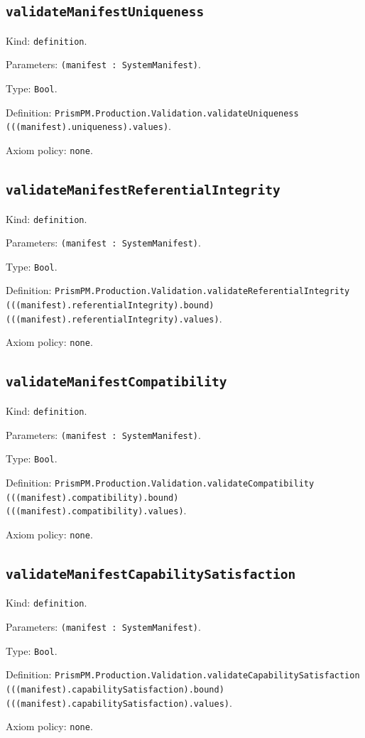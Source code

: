 \documentclass[11pt]{article}
\begin{document}
\subsection*{\texttt{validateManifestUniqueness}}
\noindent Kind: \texttt{definition}.\par
\noindent Parameters: \texttt{(manifest : SystemManifest)}.\par
\noindent Type: \texttt{Bool}.\par
\noindent Definition: \texttt{PrismPM.Production.Validation.validateUniqueness (((manifest).uniqueness).values)}.\par
\noindent Axiom policy: \texttt{none}.\par
\subsection*{\texttt{validateManifestReferentialIntegrity}}
\noindent Kind: \texttt{definition}.\par
\noindent Parameters: \texttt{(manifest : SystemManifest)}.\par
\noindent Type: \texttt{Bool}.\par
\noindent Definition: \texttt{PrismPM.Production.Validation.validateReferentialIntegrity (((manifest).referentialIntegrity).bound) (((manifest).referentialIntegrity).values)}.\par
\noindent Axiom policy: \texttt{none}.\par
\subsection*{\texttt{validateManifestCompatibility}}
\noindent Kind: \texttt{definition}.\par
\noindent Parameters: \texttt{(manifest : SystemManifest)}.\par
\noindent Type: \texttt{Bool}.\par
\noindent Definition: \texttt{PrismPM.Production.Validation.validateCompatibility (((manifest).compatibility).bound) (((manifest).compatibility).values)}.\par
\noindent Axiom policy: \texttt{none}.\par
\subsection*{\texttt{validateManifestCapabilitySatisfaction}}
\noindent Kind: \texttt{definition}.\par
\noindent Parameters: \texttt{(manifest : SystemManifest)}.\par
\noindent Type: \texttt{Bool}.\par
\noindent Definition: \texttt{PrismPM.Production.Validation.validateCapabilitySatisfaction (((manifest).capabilitySatisfaction).bound) (((manifest).capabilitySatisfaction).values)}.\par
\noindent Axiom policy: \texttt{none}.\par
\end{document}
